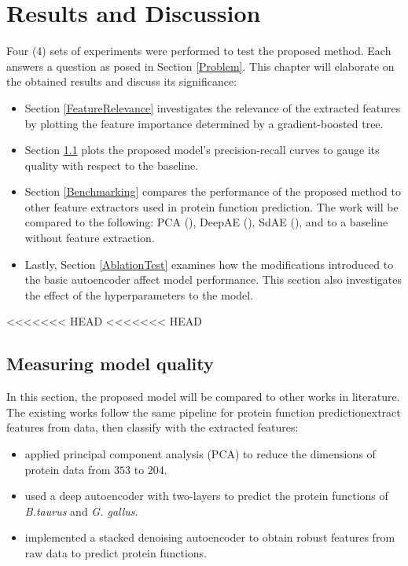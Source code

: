 \chapter{Results and Discussion}
\label{Results}

Four (4) sets of experiments were performed to test the proposed method.
Each answers a question as posed in Section \ref{Problem}.
This chapter will elaborate on the obtained results and discuss its
significance: 

\begin{itemize}
    \item Section \ref{FeatureRelevance} investigates the relevance of the
        extracted features by plotting the feature importance determined by a
        gradient-boosted tree.
    \item Section \ref{ModelQuality} plots the proposed model's
        precision-recall curves to gauge its quality with respect to the
        baseline.
    \item Section \ref{Benchmarking} compares the performance of the
        proposed method to other feature extractors used in protein function
        prediction. The work will be compared to the following: PCA
        (\cite{wang2013protein}), DeepAE (\cite{chicco2014deep}),
        SdAE (\cite{miranda2017feature}), and to a baseline without feature
        extraction.
    \item Lastly, Section \ref{AblationTest} examines how the modifications introduced
        to the basic autoencoder affect model performance. This section also
        investigates the effect of the hyperparameters to the model.
\end{itemize}

<<<<<<< HEAD
<<<<<<< HEAD
\section{Measuring model quality}
\label{ModelQuality}
\par In this section, the proposed model will be compared to other works in
literature. The existing works follow the same pipeline for protein function
prediction\textemdash extract features from data, then classify with the
extracted features:

\begin{itemize}
    \item \cite{wang2013protein} applied principal component
    analysis (PCA) to reduce the dimensions of protein data from $353$ to
    $204$. 
    \item \cite{chicco2014deep} used a deep autoencoder with two-layers
    to predict the protein functions of \textit{B.taurus} and \textit{G.
    gallus}. 
    \item \cite{miranda2017feature} implemented a stacked denoising
    autoencoder to obtain robust features from raw data to predict protein
    functions.  
\end{itemize}

